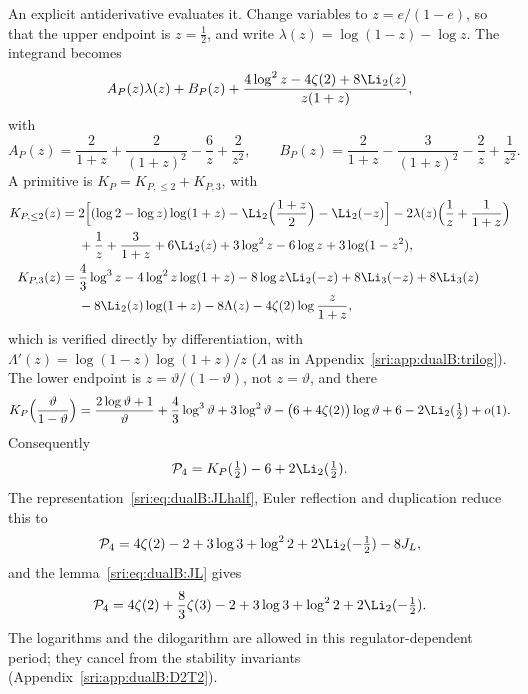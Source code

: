 An explicit antiderivative evaluates it. Change variables to $z=e/(1-e)$, so that the upper endpoint is $z=\frac12$,
and write $\lambda(z)=\log(1-z)-\log z$. The integrand becomes
\begin{equation}
 A_P(z)\lambda(z)+B_P(z)+\frac{4\log^2z-4\zeta(2)+8\Li_2(z)}{z(1+z)},
\end{equation}
with
\begin{equation}
 A_P(z)=\frac2{1+z}+\frac2{(1+z)^2}-\frac6z+\frac2{z^2},\qquad
 B_P(z)=\frac2{1+z}-\frac3{(1+z)^2}-\frac2z+\frac1{z^2}.
\end{equation}
A primitive is $K_P=K_{P,\le2}+K_{P,3}$, with
\begin{align}
 K_{P,\le2}(z)={}&2\Bigl[(\log2-\log z)\log(1+z)-\Li_2\Bigl(\frac{1+z}{2}\Bigr)-\Li_2(-z)\Bigr]
 -2\lambda(z)\Bigl(\frac1z+\frac1{1+z}\Bigr)\notag\\
 &+\frac1z+\frac3{1+z}+6\Li_2(z)+3\log^2z-6\log z+3\log(1-z^2),\\
 K_{P,3}(z)={}&\frac43\log^3z-4\log^2z\log(1+z)-8\log z\Li_2(-z)+8\Li_3(-z)+8\Li_3(z)\notag\\
 &-8\Li_2(z)\log(1+z)-8\Lambda(z)-4\zeta(2)\log\frac z{1+z},
\end{align}
which is verified directly by differentiation, with $\Lambda'(z)=\log(1-z)\log(1+z)/z$ ($\Lambda$ as in
Appendix~\ref{sri:app:dualB:trilog}). The lower endpoint is $z=\vartheta/(1-\vartheta)$, not $z=\vartheta$, and there
\begin{equation}
 K_P\Bigl(\frac\vartheta{1-\vartheta}\Bigr)=\frac{2\log\vartheta+1}{\vartheta}+\frac43\log^3\vartheta+3\log^2\vartheta
 -\bigl(6+4\zeta(2)\bigr)\log\vartheta
 +6-2\Li_2(\tfrac12)+o(1).
\end{equation}
Consequently
\begin{equation}
 \mathcal P_4=K_P(\tfrac12)-6+2\Li_2(\tfrac12).
\end{equation}
The representation~\eqref{sri:eq:dualB:JLhalf}, Euler reflection and duplication reduce this to
\begin{equation}
 \mathcal P_4=4\zeta(2)-2+3\log3+\log^22+2\Li_2(-\tfrac12)-8J_L,
\end{equation}
and the lemma~\eqref{sri:eq:dualB:JL} gives
\begin{equation}
 \mathcal P_4=4\zeta(2)+\frac83\zeta(3)-2+3\log3+\log^22+2\Li_2(-\tfrac12).
 \label{sri:eq:dualB:Pclosed}
\end{equation}
The logarithms and the dilogarithm are allowed in this regulator-dependent period; they cancel from the stability
invariants (Appendix~\ref{sri:app:dualB:D2T2}).

